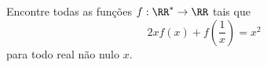 Encontre todas as funções $f: \RR^* \to \RR$ tais que
$$ 2xf(x) + f\left(\frac{1}{x}\right) = x^2$$
para todo real não nulo $x$.
